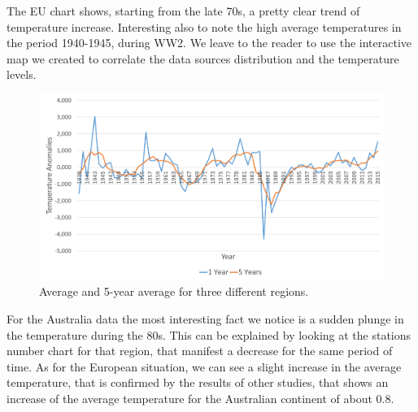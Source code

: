 \documentclass{vldb}
\begin{document}
The EU chart shows, starting from the late 70s, a pretty clear trend of temperature increase. Interesting also to note the high average temperatures in the period 1940-1945, during WW2. We leave to the reader to use the interactive map we created to correlate the data sources distribution and the temperature levels.

\begin{figure}[tbh]
\includegraphics[width=1\linewidth]{AuAnomalies}
\caption{Average and 5-year average for three different regions.}
\label{fig:AuAnomalies}
\end{figure}

For the Australia data the most interesting fact we notice is a sudden plunge in the temperature during the 80s. This can be explained by looking at the stations number chart for that region, that manifest a decrease for the same period of time. As for the European situation, we can see a slight increase in the average temperature, that is confirmed by the results of other studies, that shows an increase of the average temperature for the Australian continent of about 0.8\degree. 
\end{document}
